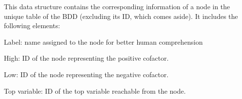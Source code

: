 This data structure contains the corresponding information of a node in the unique table of the B\+DD (excluding its ID, which comes aside). It includes the following elements\+:
\begin{DoxyItemize}
\item Label\+: name assigned to the node for better human comprehension
\item High\+: ID of the node representing the positive cofactor.
\item Low\+: ID of the node representing the negative cofactor.
\item Top variable\+: ID of the top variable reachable from the node. 
\end{DoxyItemize}